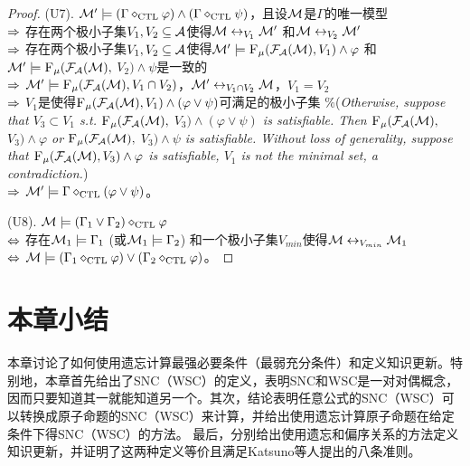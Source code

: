 \begin{proof}
	
	
	(U7). ${\cal M}' \models (\Gamma \diamond_{\textrm{CTL}} \varphi) \wedge (\Gamma \diamond_{\textrm{CTL}} \psi)$，且设${\cal M}$是$\Gamma$的唯一模型\\
	$\Rightarrow$ 存在两个极小子集$V_1, V_2 \subseteq {\cal A}$使得${\cal M} \leftrightarrow_{V_1} {\cal M}'$ 和${\cal M} \leftrightarrow_{V_2} {\cal M}'$\\
	$\Rightarrow$ 存在两个极小子集$V_1, V_2 \subseteq {\cal A}$使得${\cal M}' \models {\textsc{F}_{\textsc{$\mu$}}}({\cal F}_{{\cal A}}({\cal M}), V_1) \wedge \varphi$ 和 ${\cal M}' \models {\textsc{F}_{\textsc{$\mu$}}}({\cal F}_{{\cal A}}({\cal M}),$ $V_2) \wedge \psi$是一致的\\
	$\Rightarrow$ ${\cal M}' \models {\textsc{F}_{\textsc{$\mu$}}}({\cal F}_{{\cal A}}({\cal M}), V_1 \cap V_2)$，${\cal M}' \leftrightarrow_{V_1 \cap V_2} {\cal M}$，$V_1 = V_2$\\
	$\Rightarrow$  $V_1$是使得${\textsc{F}_{\textsc{$\mu$}}}({\cal F}_{{\cal A}}({\cal M}), V_1) \wedge (\varphi \vee \psi)$可满足的极小子集 \qquad  \textcolor[RGB]{0,134,139}{$\%$({\em Otherwise, suppose that $V_3\subset V_1$ s.t. ${\textsc{F}_{\textsc{$\mu$}}}({\cal F}_{{\cal A}}({\cal M}),$ $V_3) \wedge (\varphi \vee \psi)$ is satisfiable. Then ${\textsc{F}_{\textsc{$\mu$}}}({\cal F}_{{\cal A}}({\cal M}),$ $V_3) \wedge \varphi$ or ${\textsc{F}_{\textsc{$\mu$}}}({\cal F}_{{\cal A}}({\cal M}),$ $V_3) \wedge \psi$ is satisfiable. Without loss of generality, suppose that ${\textsc{F}_{\textsc{$\mu$}}}({\cal F}_{{\cal A}}({\cal M}), V_3) \wedge \varphi$ is satisfiable, $V_1$ is not the minimal set, a contradiction.})}\\
	$\Rightarrow$ ${\cal M}' \models \Gamma \diamond_{\textrm{CTL}} (\varphi \vee \psi)$。
	
	
	
	(U8). ${\cal M} \models (\Gamma_1 \vee \Gamma_2) \diamond_{\textrm{CTL}} \varphi$ \\
	$\Leftrightarrow$ 存在${\cal M}_1 \models \Gamma_1$ (或${\cal M}_1 \models \Gamma_2$) 和一个极小子集$V_{min}$使得${\cal M} \leftrightarrow_{V_{min}} {\cal M}_1$\\
	$\Leftrightarrow$ ${\cal M} \models (\Gamma_1 \diamond_{\textrm{CTL}} \varphi) \vee (\Gamma_2 \diamond_{\textrm{CTL}} \varphi)$。
\end{proof}



\section{本章小结}\label{sec:chapter04-conclusion}

本章讨论了如何使用遗忘计算最强必要条件（最弱充分条件）和定义知识更新。特别地，本章首先给出了SNC（WSC）的定义，表明SNC和WSC是一对对偶概念，因而只要知道其一就能知道另一个。其次，结论表明任意公式的SNC（WSC）可以转换成原子命题的SNC（WSC）来计算，并给出使用遗忘计算原子命题在给定条件下得SNC（WSC）的方法。
最后，分别给出使用遗忘和偏序关系的方法定义知识更新，并证明了这两种定义等价且满足Katsuno等人提出的八条准则。

